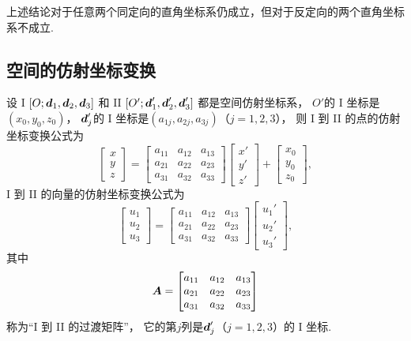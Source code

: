 上述结论对于任意两个同定向的直角坐标系仍成立，但对于反定向的两个直角坐标系不成立.

\subsection{空间的仿射坐标变换}
\begin{theorem}\label{theorem:解析几何.空间的仿射坐标变换公式}
设 I \([O;\boldsymbol{d}_1,\boldsymbol{d}_2,\boldsymbol{d}_3]\)
和 II \([O';\boldsymbol{d}_1',\boldsymbol{d}_2',\boldsymbol{d}_3']\)
都是空间仿射坐标系，
\(O'\)的 I 坐标是\((x_0,y_0,z_0)\)，
\(\boldsymbol{d}_j'\)的 I 坐标是\((a_{1j},a_{2j},a_{3j})\)（\(j=1,2,3\)），
则 I 到 II 的点的仿射坐标变换公式为
\begin{equation}
	\begin{bmatrix}
		x \\ y \\ z
	\end{bmatrix} = \begin{bmatrix}
		a_{11} & a_{12} & a_{13} \\
		a_{21} & a_{22} & a_{23} \\
		a_{31} & a_{32} & a_{33}
	\end{bmatrix} \begin{bmatrix}
		x' \\ y' \\ z'
	\end{bmatrix} + \begin{bmatrix}
		x_0 \\ y_0 \\ z_0
	\end{bmatrix},
\end{equation}
I 到 II 的向量的仿射坐标变换公式为
\begin{equation}
	\begin{bmatrix}
		u_1 \\ u_2 \\ u_3
	\end{bmatrix} = \begin{bmatrix}
		a_{11} & a_{12} & a_{13} \\
		a_{21} & a_{22} & a_{23} \\
		a_{31} & a_{32} & a_{33}
	\end{bmatrix} \begin{bmatrix}
		u_1' \\ u_2' \\ u_3'
	\end{bmatrix},
\end{equation}
其中\[
	\boldsymbol{A} = \begin{bmatrix}
		a_{11} & a_{12} & a_{13} \\
		a_{21} & a_{22} & a_{23} \\
		a_{31} & a_{32} & a_{33}
	\end{bmatrix}
\]称为“I 到 II 的过渡矩阵”，
它的第\(j\)列是\(\boldsymbol{d}_j'\)（\(j=1,2,3\)）的 I 坐标.
\end{theorem}

